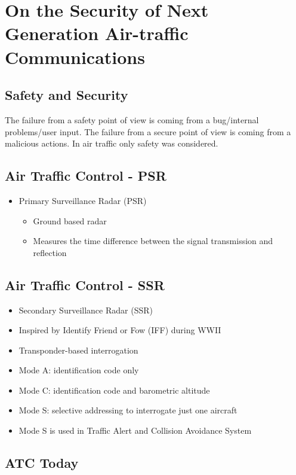\section{On the Security of Next Generation Air-traffic Communications}

\subsection{Safety and Security}
The failure from a safety point of view is coming from a bug/internal
problems/user input. The failure from a secure point of view is coming from a
malicious actions.
In air traffic only safety was considered.

\subsection{Air Traffic Control - PSR}
\begin{itemize}
	\item Primary Surveillance Radar (PSR)
	\begin{itemize}
		\item Ground based radar
		\item Measures the time difference between the signal transmission and 
		reflection
	\end{itemize}
\end{itemize}

\subsection{Air Traffic Control - SSR}
\begin{itemize}
	\item Secondary Surveillance Radar (SSR)
	\item Inspired by Identify Friend or Fow (IFF) during WWII
	\item Transponder-based interrogation
	\item Mode A: identification code only
	\item Mode C: identification code and barometric altitude
	\item Mode S: selective addressing to interrogate just one aircraft
	\item Mode S is used in Traffic Alert and Collision Avoidance System
\end{itemize}

\subsection{ATC Today}

